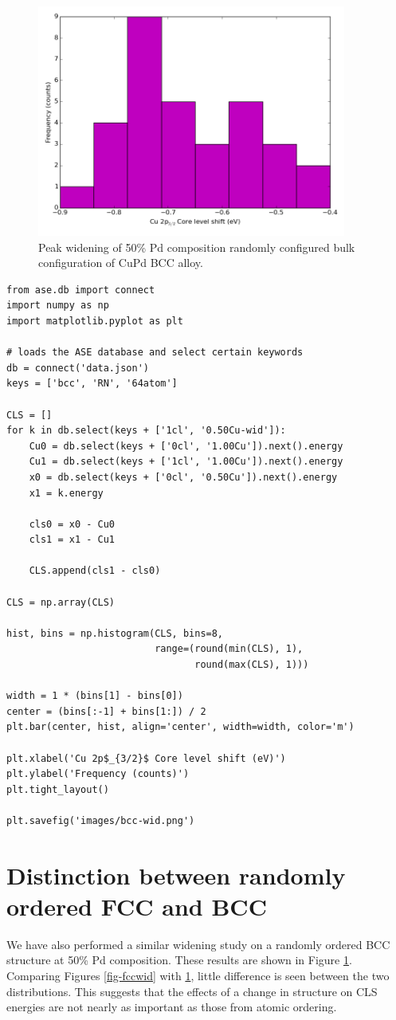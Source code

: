 \documentclass[number, sort&compress, review, 12pt]{elsarticle}
\begin{document}
\begin{figure}[H]
\centering
\includegraphics[width=4in]{./images/bcc-wid.png}
\caption{\label{fig-bccwid}Peak widening of 50\% Pd composition randomly configured bulk configuration of CuPd BCC alloy.}
\end{figure}

\begin{verbatim}
from ase.db import connect
import numpy as np
import matplotlib.pyplot as plt

# loads the ASE database and select certain keywords
db = connect('data.json')
keys = ['bcc', 'RN', '64atom']

CLS = []
for k in db.select(keys + ['1cl', '0.50Cu-wid']):
    Cu0 = db.select(keys + ['0cl', '1.00Cu']).next().energy
    Cu1 = db.select(keys + ['1cl', '1.00Cu']).next().energy
    x0 = db.select(keys + ['0cl', '0.50Cu']).next().energy
    x1 = k.energy

    cls0 = x0 - Cu0
    cls1 = x1 - Cu1

    CLS.append(cls1 - cls0)

CLS = np.array(CLS)

hist, bins = np.histogram(CLS, bins=8,
                          range=(round(min(CLS), 1),
                                 round(max(CLS), 1)))

width = 1 * (bins[1] - bins[0])
center = (bins[:-1] + bins[1:]) / 2
plt.bar(center, hist, align='center', width=width, color='m')

plt.xlabel('Cu 2p$_{3/2}$ Core level shift (eV)')
plt.ylabel('Frequency (counts)')
plt.tight_layout()

plt.savefig('images/bcc-wid.png')
\end{verbatim}

\section{Distinction between randomly ordered FCC and BCC}
\label{sec-7}
We have also performed a similar widening study on a randomly ordered BCC structure at 50\% Pd composition. These results are shown in Figure \ref{fig-bccwid}. Comparing Figures \ref{fig-fccwid} with \ref{fig-bccwid}, little difference is seen between the two distributions. This suggests that the effects of a change in structure on CLS energies are not nearly as important as those from atomic ordering.
\end{document}
